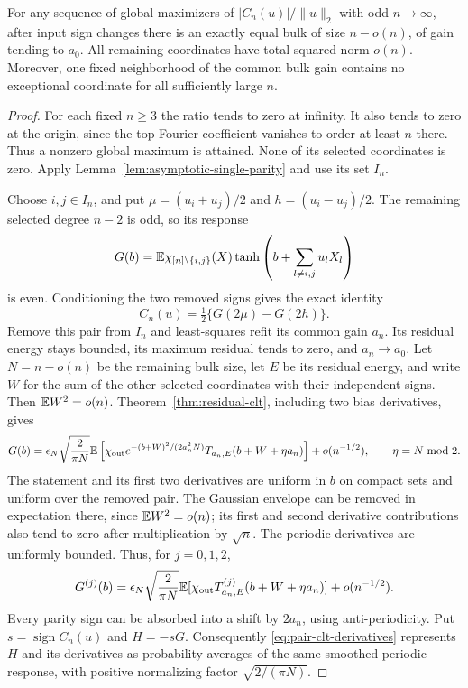 \begin{lemma}
\label{lem:exact-majority}
For any sequence of global maximizers of $|C_n(u)|/\|u\|_2$ with
odd $n\to\infty$, after input sign changes there is an exactly equal
bulk of size $n-o(n)$, of gain tending to $a_0$. All remaining
coordinates have total squared norm $o(n)$. Moreover, one fixed
neighborhood of the common bulk gain contains no exceptional
coordinate for all sufficiently large $n$.
\end{lemma}
\begin{proof}
For each fixed $n\ge3$ the ratio tends to zero at infinity. It also
tends to zero at the origin, since the top Fourier coefficient
vanishes to order at least $n$ there. Thus a nonzero global maximum
is attained. None of its selected coordinates is zero. Apply
Lemma~\ref{lem:asymptotic-single-parity} and use its set $I_n$.

Choose $i,j\in I_n$, and put
$\mu=(u_i+u_j)/2$ and $h=(u_i-u_j)/2$. The remaining selected
degree $n-2$ is odd, so its response
\[
 G(b)=\mathbb E\chi_{[n]\setminus\{i,j\}}(X)
       \tanh\left(b+\sum_{l\ne i,j}u_lX_l\right)
\]
is even. Conditioning the two removed signs gives the exact identity
\begin{equation}\label{eq:pair-response}
 C_n(u)=\tfrac12\{G(2\mu)-G(2h)\}.
\end{equation}
Remove this pair from $I_n$ and least-squares refit its common gain
$a_n$. Its residual energy stays bounded, its maximum residual tends
to zero, and $a_n\to a_0$. Let $N=n-o(n)$ be the remaining bulk size,
let $E$ be its residual energy, and write $W$ for the sum of the
other selected coordinates with their independent signs. Then
$\mathbb E W^2=o(n)$. Theorem~\ref{thm:residual-clt}, including two bias
derivatives, gives
\[
 G(b)=\epsilon_N\sqrt{\frac2{\pi N}}
 \mathbb E\left[\chi_{\rm out}
 e^{-(b+W)^2/(2a_n^2N)}
 T_{a_n,E}(b+W+\eta a_n)\right]+o(n^{-1/2}),
 \qquad \eta=N\bmod2.
\]
The statement and its first two derivatives are uniform in $b$ on
compact sets and uniform over the removed pair. The Gaussian
envelope can be removed in expectation there, since
$\mathbb E W^2=o(n)$; its first and second derivative contributions also
tend to zero after multiplication by $\sqrt n$. The periodic
derivatives are uniformly bounded. Thus, for $j=0,1,2$,
\begin{equation}\label{eq:pair-clt-derivatives}
 G^{(j)}(b)=\epsilon_N\sqrt{\frac2{\pi N}}
 \mathbb E[\chi_{\rm out}T_{a_n,E}^{(j)}(b+W+\eta a_n)]
 +o(n^{-1/2}).
\end{equation}
Every parity sign can be absorbed into a shift by $2a_n$, using
anti-periodicity. Put $s=\operatorname{sign}C_n(u)$ and $H=-sG$.
Consequently \eqref{eq:pair-clt-derivatives} represents $H$ and its
derivatives as probability averages of the same smoothed periodic
response, with positive normalizing factor $\sqrt{2/(\pi N)}$.


\end{proof}
